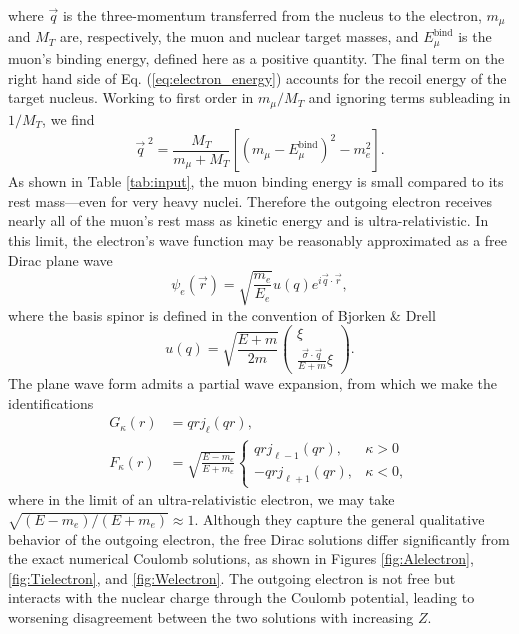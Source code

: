 \documentclass{book}[letterpaper,12pt]
\begin{document}
where $\vec{q}$ is the three-momentum transferred from the nucleus to the electron, $m_{\mu}$ and $M_T$ are, respectively, the muon and nuclear target masses, and $E_{\mu}^\mathrm{bind}$ is the muon's binding energy, defined here as a positive quantity. The final term on the right hand side of Eq. (\ref{eq:electron_energy}) accounts for the recoil energy of the target nucleus. Working to first order in $m_{\mu}/M_T$ and ignoring terms subleading in $1/M_T$, we find
\begin{equation}
\vec{q}^{\;2}=\frac{M_T}{m_{\mu}+M_T}\left[\left(m_{\mu}-E_{\mu}^\mathrm{bind}\right)^2-m_e^2\right].
\end{equation}
As shown in Table \ref{tab:input}, the muon binding energy is small compared to its rest mass---even for very heavy nuclei. Therefore the outgoing electron receives nearly all of the muon's rest mass as kinetic energy and is ultra-relativistic. In this limit, the electron's wave function may be reasonably approximated as a free Dirac plane wave
\begin{equation}
\psi_e(\vec{r})=\sqrt{\frac{m_e}{E_e}}u(q)e^{i\vec{q}\cdot\vec{r}},
\end{equation}
where the basis spinor is defined in the convention of Bjorken \& Drell \cite{Bjorken:1965sts}
\begin{equation}
u(q)=\sqrt{\frac{E+m}{2m}}\left(\begin{array}{c}
\xi\\
\frac{\vec{\sigma}\cdot\vec{q}}{E+m}\xi
\end{array}\right).
\end{equation}
The plane wave form admits a partial wave expansion, from which we make the identifications
\begin{equation}
\begin{split}
G_{\kappa}(r)&=qrj_{\ell}(qr),\\
F_{\kappa}(r)&=\sqrt{\frac{E-m_e}{E+m_e}}\left\{\begin{array}{cc}
qrj_{\ell-1}(qr), & \kappa>0\\
-qrj_{\ell+1}(qr), &\kappa < 0,
\end{array}\right.
\end{split}
\end{equation}
where in the limit of an ultra-relativistic electron, we may take $\sqrt{(E-m_e)/(E+m_e)}\approx 1$. Although they capture the general qualitative behavior of the outgoing electron, the free Dirac solutions differ significantly from the exact numerical Coulomb solutions, as shown in Figures \ref{fig:Alelectron}, \ref{fig:Tielectron}, and \ref{fig:Welectron}. The outgoing electron is not free but interacts with the nuclear charge through the Coulomb potential, leading to worsening disagreement between the two solutions with increasing $Z$.
\end{document}

